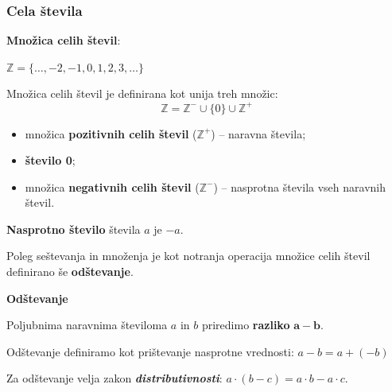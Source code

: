         \begin{frame}
            \frametitle{Cela števila}

            \textbf{Množica celih števil}: 
                \begin{alertblock}{}
                    \centering\boldmath
                    $\mathbb{Z} = \{\ldots, -2, -1, 0, 1, 2, 3, \ldots\}$
                \end{alertblock}

                Množica celih števil je definirana kot unija treh množic:
                $$\mathbb{Z} = \mathbb{Z}^- \cup \{0\} \cup \mathbb{Z}^+$$

                \begin{itemize}
                    \item množica \textbf{pozitivnih celih števil} ($\mathbb{Z}^+$) -- naravna števila;
                    \item \textbf{število 0};
                    \item množica \textbf{negativnih celih števil} ($\mathbb{Z}^-$) -- nasprotna števila vseh naravnih števil.
                \end{itemize}
                
                \medskip
                \textbf{Nasprotno število} števila $a$ je $-a$.
        \end{frame}

        \begin{frame}

            Poleg seštevanja in množenja je kot notranja operacija množice celih števil
            definirano še \textbf{odštevanje}.

            \bigskip
            \textbf{\large{Odštevanje}}
            
            \bigskip
            Poljubnima naravnima številoma $a$ in $b$ priredimo \textbf{razliko} $\mathbf{a - b}$.
            
            \bigskip
            Odštevanje definiramo kot prištevanje nasprotne vrednosti: $a-b = a+(-b)$

            \bigskip
            Za odštevanje velja zakon \textit{\textbf{distributivnosti}}: $a \cdot (b-c) = a \cdot b - a
            \cdot c$.

        \end{frame}

